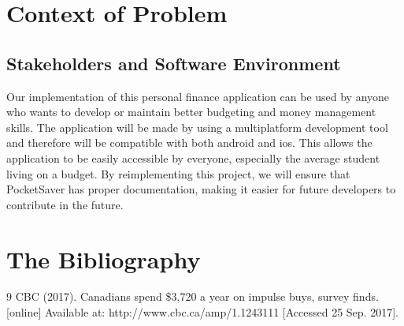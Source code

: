 \documentclass[12pt]{article}
\begin{document}
\section{Context of Problem}
\subsection{Stakeholders and Software Environment}
Our implementation of this personal finance application can be used by anyone who wants to develop or maintain better budgeting and money management skills. The application will be made by using a multiplatform development tool and therefore will be compatible with both android and ios. This allows the application to be easily accessible by everyone, especially the average student living on a budget. By reimplementing this project, we will ensure that PocketSaver has proper documentation, making it easier for future developers to contribute in the future.


\section{The Bibliography}{9}
CBC (2017). Canadians spend \$3,720 a year on impulse buys, survey finds. [online] Available at: http://www.cbc.ca/amp/1.1243111 [Accessed 25 Sep. 2017].
\end{document}
